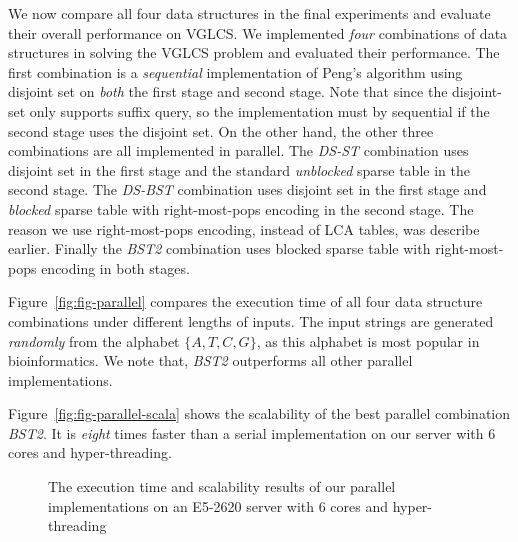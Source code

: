 We now compare all four data structures in the final experiments and
evaluate their overall performance on VGLCS.  We implemented {\em
  four} combinations of data structures in solving the VGLCS problem
and evaluated their performance.  The first combination is a {\em
  sequential} implementation of Peng's algorithm using disjoint set on
{\em both} the first stage and second stage.  Note that since the
disjoint-set only supports suffix query, so the implementation must by
sequential if the second stage uses the disjoint set.  On the other
hand, the other three combinations are all implemented in parallel.
The {\em DS-ST} combination uses disjoint set in the first stage and
the standard {\em unblocked} sparse table in the second stage.  The
{\em DS-BST} combination uses disjoint set in the first stage and {\em
  blocked} sparse table with right-most-pops encoding in the second
stage.  The reason we use right-most-pops encoding, instead of LCA
tables, was describe earlier.  Finally the {\em BST2} combination uses
blocked sparse table with right-most-pops encoding in both stages.

Figure~\ref{fig:fig-parallel} compares the execution time of all four
data structure combinations under different lengths of inputs.  The
input strings are generated {\em randomly} from the alphabet $\{A, T,
C, G\}$, as this alphabet is most popular in bioinformatics.  We note
that, {\em BST2} outperforms all other parallel implementations. %

Figure~\ref{fig:fig-parallel-scala} shows the scalability of the best
parallel combination {\em BST2}.  It is {\em eight} times faster than
a serial implementation on our server with 6 cores and
hyper-threading.

\begin{figure}
  \centering
  \caption{The execution time and scalability results of our parallel
    implementations on an E5-2620 server with 6 cores and
    hyper-threading}
\end{figure}

